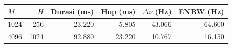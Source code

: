 \begin{tabular}{lrrrrr}
\toprule
$M$ & $H$ & Durasi (ms) & Hop (ms) & $\Delta\nu$ (Hz) & ENBW (Hz) \\
\midrule
1024 & 256 & 23.220 & 5.805 & 43.066 & 64.600 \\
4096 & 1024 & 92.880 & 23.220 & 10.767 & 16.150 \\
\bottomrule
\end{tabular}
